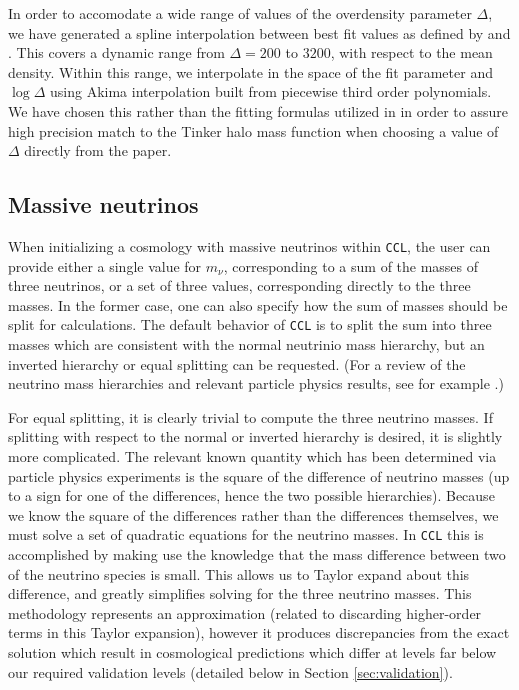 \documentclass[\docopts]{\docclass}
\newcommand{\ccl}{{\tt CCL}\xspace}
\begin{document}
In order to accomodate a wide range of values of the overdensity parameter $\Delta$, we have generated a spline interpolation between best fit values as defined by \citet{Tinker2008} and \citet{Tinker2010}. This covers a dynamic range from $\Delta=200$ to $3200$, with respect to the mean density. Within this range, we interpolate in the space of the fit parameter and $\log\Delta$ using Akima interpolation built from piecewise third order polynomials. We have chosen this rather than the fitting formulas utilized in \citet{Tinker2010} in order to assure high precision match to the Tinker halo mass function when choosing a value of $\Delta$ directly from the paper. 


\subsection{Massive neutrinos}

When initializing a cosmology with massive neutrinos within \ccl , the user can provide either a single value for $m_\nu$, corresponding to a sum of the masses of three neutrinos, or a set of three values, corresponding directly to the three masses. In the former case, one can also specify how the sum of masses should be split for calculations. The default behavior of \ccl is to split the sum into three masses which are consistent with the normal neutrinio mass hierarchy, but an inverted hierarchy or equal splitting can be requested. (For a review of the neutrino mass hierarchies and relevant particle physics results, see for example \citealt{Gerbino2017, Lesgourgues2012}.)

For equal splitting, it is clearly trivial to compute the three neutrino masses. If splitting with respect to the normal or inverted hierarchy is desired, it is slightly more complicated. The relevant known quantity which has been determined via particle physics experiments is the square of the difference of neutrino masses (up to a sign for one of the differences, hence the two possible hierarchies). Because we know the square of the differences rather than the differences themselves, we must solve a set of quadratic equations for the neutrino masses. In \ccl this is accomplished by making use the knowledge that the mass difference between two of the neutrino species is small. This allows us to Taylor expand about this difference, and greatly simplifies solving for the three neutrino masses. This methodology represents an approximation (related to discarding higher-order terms in this Taylor expansion), however it produces discrepancies from the exact solution which result in cosmological predictions which differ at levels far below our required validation levels (detailed below in Section \ref{sec:validation}).
\end{document}
